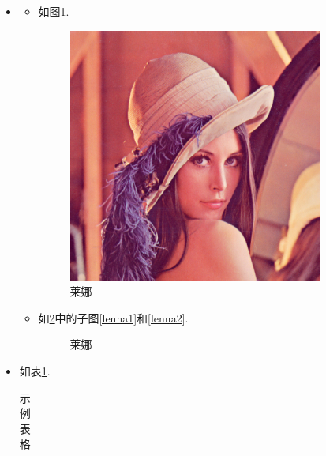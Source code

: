 \documentclass{assignment}
\begin{document}
    \begin{jie}
        \begin{itemize}
            \item[(1)]
            \begin{itemize}
                \item[(a)] 如图\ref{Lenna}.
                \begin{figure}[H]
                    \centering
                    \includegraphics[width=.2\textwidth]{Lenna.jpg}
                    \caption{莱娜}
                    \label{Lenna}
                \end{figure}
                \item[(b)] 如\ref{Lenna2}中的子图\ref{lenna1}和\ref{lenna2}.
                \begin{figure}[h]
                    \centering
                    \caption{莱娜}
                    \label{Lenna2}
                \end{figure}
            \end{itemize}
            \item[(2)] 如表\ref{my-table}.
            \begin{center}
                \begin{longtable}{ccccc}
                    \caption{示例表格}
                    \label{my-table}\\ \toprule

\end{longtable}
\end{center}
\end{itemize}
\end{jie}
\end{document}
